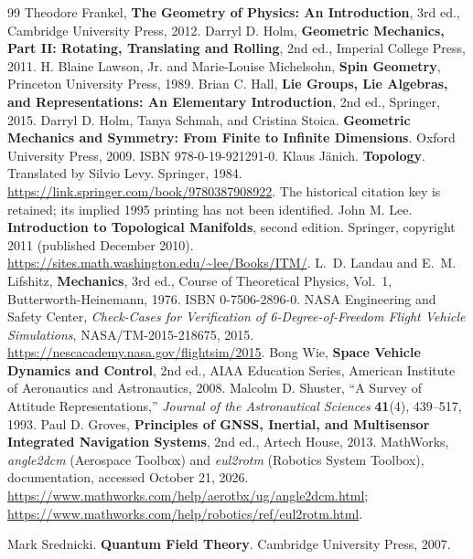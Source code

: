 \begin{thebibliography}{99}
Theodore Frankel, \textbf{The Geometry of Physics: An Introduction}, 3rd ed.,
Cambridge University Press, 2012.
Darryl D. Holm, \textbf{Geometric Mechanics, Part II: Rotating, Translating
and Rolling}, 2nd ed., Imperial College Press, 2011.
H. Blaine Lawson, Jr. and Marie-Louise Michelsohn, \textbf{Spin Geometry},
Princeton University Press, 1989.
Brian C. Hall, \textbf{Lie Groups, Lie Algebras, and Representations: An
Elementary Introduction}, 2nd ed., Springer, 2015.
Darryl D. Holm, Tanya Schmah, and Cristina Stoica.
\textbf{Geometric Mechanics and Symmetry: From Finite to Infinite Dimensions}.
Oxford University Press, 2009. ISBN 978-0-19-921291-0.
Klaus J\"anich. \textbf{Topology}. Translated by Silvio Levy.
Springer, 1984. \url{https://link.springer.com/book/9780387908922}.
The historical citation key is retained; its implied 1995 printing has not
been identified.
John M. Lee. \textbf{Introduction to Topological Manifolds}, second edition.
Springer, copyright 2011 (published December 2010).
\url{https://sites.math.washington.edu/~lee/Books/ITM/}.
L.~D. Landau and E.~M. Lifshitz, \textbf{Mechanics}, 3rd ed., Course of
Theoretical Physics, Vol.~1, Butterworth-Heinemann, 1976.
ISBN 0-7506-2896-0.
NASA Engineering and Safety Center, \emph{Check-Cases for Verification of
6-Degree-of-Freedom Flight Vehicle Simulations}, NASA/TM-2015-218675, 2015.
\url{https://nescacademy.nasa.gov/flightsim/2015}.
Bong Wie, \textbf{Space Vehicle Dynamics and Control}, 2nd ed., AIAA
Education Series, American Institute of Aeronautics and Astronautics, 2008.
Malcolm D. Shuster, ``A Survey of Attitude Representations,''
\emph{Journal of the Astronautical Sciences} \textbf{41}(4), 439--517, 1993.
Paul D. Groves, \textbf{Principles of GNSS, Inertial, and Multisensor
Integrated Navigation Systems}, 2nd ed., Artech House, 2013.
MathWorks, \emph{angle2dcm} (Aerospace Toolbox) and \emph{eul2rotm}
(Robotics System Toolbox), documentation, accessed October 21, 2026.
\url{https://www.mathworks.com/help/aerotbx/ug/angle2dcm.html};
\url{https://www.mathworks.com/help/robotics/ref/eul2rotm.html}.

Mark Srednicki. \textbf{Quantum Field Theory}. Cambridge University Press, 2007.

\end{thebibliography}
